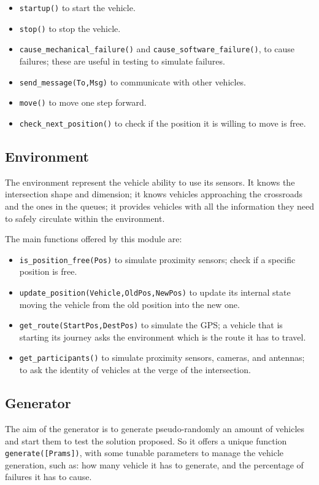 \documentclass{memoir}
\begin{document}
\begin{itemize}
	\item \texttt{startup()} to start the vehicle.
	\item \texttt{stop()} to stop the vehicle.
	\item \texttt{cause\_mechanical\_failure()} and \texttt{cause\_software\_failure()}, to cause failures; these are useful in testing to simulate failures.
	\item \texttt{send\_message(To,Msg)} to communicate with other vehicles.
	\item \texttt{move()} to move one step forward.
	\item \texttt{check\_next\_position()} to check if the position it is willing to move is free.
\end{itemize}


\subsection{Environment}
The environment represent the vehicle ability to use its sensors. It knows the intersection shape and dimension; it knows vehicles approaching the crossroads and the ones in the queues; it provides vehicles with all the information they need to safely circulate within the environment.

The main functions offered by this module are:

\begin{itemize}
	\item \texttt{is\_position\_free(Pos)} to simulate proximity sensors; check if a specific position is free.
	\item \texttt{update\_position(Vehicle,OldPos,NewPos)} to update its internal state moving the vehicle from the old position into the new one.
	\item \texttt{get\_route(StartPos,DestPos)} to simulate the GPS; a vehicle that is starting its journey asks the environment which is the route it has to travel.
	\item \texttt{get\_participants()} to simulate proximity sensors, cameras, and antennas; to ask the identity of vehicles at the verge of the intersection. 
\end{itemize}

\subsection{Generator}
The aim of the generator is to generate pseudo-randomly an amount of vehicles and start them to test the solution proposed. So it offers a unique function \verb|generate([Prams])|, with some tunable parameters to manage the vehicle generation, such as: how many vehicle it has to generate, and the percentage of failures it has to cause.
\end{document}
